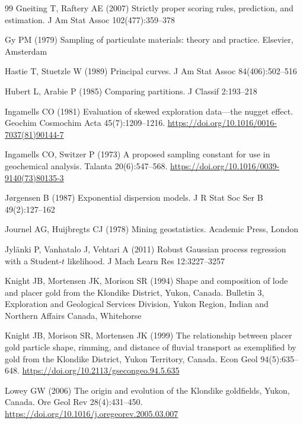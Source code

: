 \documentclass[11pt,a4paper]{article}
\theoremstyle{remark}
\begin{document}
\begin{thebibliography}{99}
Gneiting T, Raftery AE (2007) Strictly proper scoring rules, prediction, and estimation. J Am Stat Assoc 102(477):359--378

Gy PM (1979) Sampling of particulate materials: theory and practice. Elsevier, Amsterdam

Hastie T, Stuetzle W (1989) Principal curves. J Am Stat Assoc 84(406):502--516

Hubert L, Arabie P (1985) Comparing partitions. J Classif 2:193--218

Ingamells CO (1981) Evaluation of skewed exploration data---the nugget effect. Geochim Cosmochim Acta 45(7):1209--1216. \url{https://doi.org/10.1016/0016-7037(81)90144-7}

Ingamells CO, Switzer P (1973) A proposed sampling constant for use in geochemical analysis. Talanta 20(6):547--568. \url{https://doi.org/10.1016/0039-9140(73)80135-3}

J{\o}rgensen B (1987) Exponential dispersion models. J R Stat Soc Ser B 49(2):127--162

Journel AG, Huijbregts CJ (1978) Mining geostatistics. Academic Press, London

Jyl{\"a}nki P, Vanhatalo J, Vehtari A (2011) Robust Gaussian process regression with a Student-$t$ likelihood. J Mach Learn Res 12:3227--3257

Knight JB, Mortensen JK, Morison SR (1994) Shape and composition of lode and placer gold from the Klondike District, Yukon, Canada. Bulletin 3, Exploration and Geological Services Division, Yukon Region, Indian and Northern Affairs Canada, Whitehorse

Knight JB, Morison SR, Mortensen JK (1999) The relationship between placer gold particle shape, rimming, and distance of fluvial transport as exemplified by gold from the Klondike District, Yukon Territory, Canada. Econ Geol 94(5):635--648. \url{https://doi.org/10.2113/gsecongeo.94.5.635}

Lowey GW (2006) The origin and evolution of the Klondike goldfields, Yukon, Canada. Ore Geol Rev 28(4):431--450. \url{https://doi.org/10.1016/j.oregeorev.2005.03.007}


\end{thebibliography}
\end{document}

